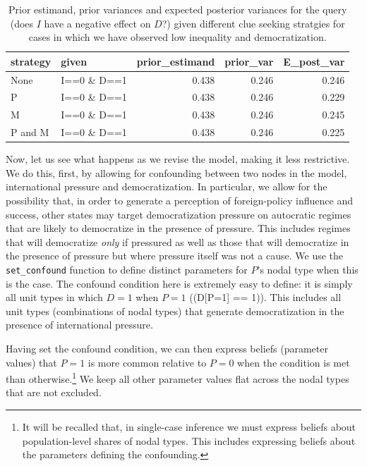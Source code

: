 \documentclass[
  12pt,
]{book}
\begin{document}
\begin{table}

\caption{\label{tab:pimdlearn}\label{pimdlearn_i0d1}Prior estimand, prior variances and expected posterior variances for the query (does $I$ have a negative effect on $D$?) given different  clue seeking  stratgies for cases in which we have observed low inequality and democratization.}
\centering
\begin{tabular}[t]{l|l|r|r|r}
\hline
strategy & given & prior\_estimand & prior\_var & E\_post\_var\\
\hline
None & I==0 \& D==1 & 0.438 & 0.246 & 0.246\\
\hline
P & I==0 \& D==1 & 0.438 & 0.246 & 0.229\\
\hline
M & I==0 \& D==1 & 0.438 & 0.246 & 0.245\\
\hline
P and M & I==0 \& D==1 & 0.438 & 0.246 & 0.225\\
\hline
\end{tabular}
\end{table}

Now, let us see what happens as we revise the model, making it less restrictive. We do this, first, by allowing for confounding between two nodes in the model, international pressure and democratization. In particular, we allow for the possibility that, in order to generate a perception of foreign-policy influence and success, other states may target democratization pressure on autocratic regimes that are likely to democratize in the presence of pressure. This includes regimes that will democratize \emph{only} if pressured as well as those that will democratize in the presence of pressure but where pressure itself was not a cause. We use the \texttt{set\_confound} function to define distinct parameters for \(P\)'s nodal type when this is the case. The confound condition here is extremely easy to define: it is simply all unit types in which \(D=1\) when \(P=1\) ((D{[}P=1{]} == 1)). This includes all unit types (combinations of nodal types) that generate democratization in the presence of international pressure.

Having set the confound condition, we can then express beliefs (parameter values) that \(P=1\) is more common relative to \(P=0\) when the condition is met than otherwise.\footnote{It will be recalled that, in single-case inference we must express beliefs about population-level shares of nodal types. This includes expressing beliefs about the parameters defining the confounding.} We keep all other parameter values flat across the nodal types that are not excluded.
\end{document}
